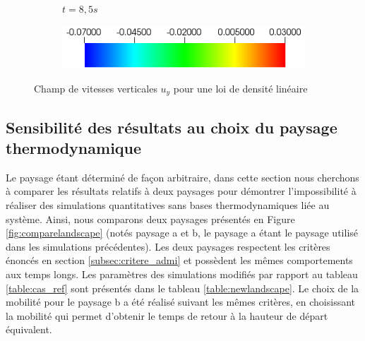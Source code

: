 \begin{figure}[H]
\begin{subfigure}[ht!]{0.18\textwidth}
		\caption{$t=8,5s$}
	\end{subfigure}
	\begin{subfigure}[ht!]{0.4\textwidth}
	\centering
	\includegraphics[width=1\textwidth]{fig_plateau_vitesse2/colorbar2.png}
\end{subfigure}
	\caption{Champ de vitesses verticales $u_y$ pour une loi de densité linéaire}
	\label{fig:secondplat2}
\end{figure}

\subsection{Sensibilité des résultats au choix du paysage thermodynamique}
Le paysage étant déterminé de façon arbitraire, dans cette section nous cherchons à comparer les résultats relatifs à deux paysages pour démontrer l'impossibilité à réaliser des simulations quantitatives sans bases thermodynamiques liée au système. Ainsi, nous comparons deux paysages présentés en Figure \ref{fig:comparelandscape} (notés paysage a et b, le paysage a étant le paysage utilisé dans les simulations précédentes). Les deux paysages respectent les critères énoncés en section \ref{subsec:critere_admi} et possèdent les mêmes comportements aux temps longs. Les paramètres des simulations modifiés par rapport au tableau \ref{table:cas_ref} sont présentés dans le tableau \ref{table:newlandscape}. Le choix de la mobilité pour le paysage b a été réalisé suivant les mêmes critères, en choisissant la mobilité qui permet d'obtenir le temps de retour à la hauteur de départ équivalent.

